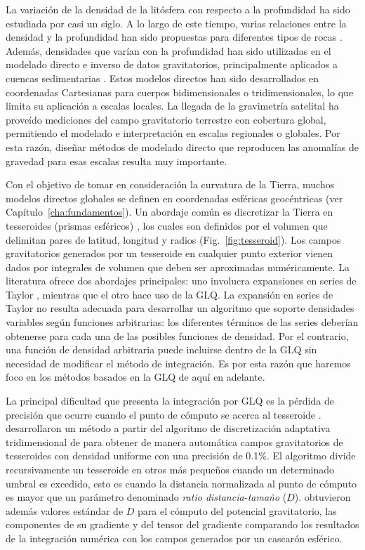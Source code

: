 La variación de la densidad de la litósfera con respecto a la profundidad ha
sido estudiada por casi un siglo.
A lo largo de este tiempo, varias relaciones entre la densidad y la profundidad
han sido propuestas para diferentes tipos de rocas
\citep[por ejemplo~][]{maxant1980, rao1986, rao1993, rao1994}.
Además, densidades que varían con la profundidad han sido utilizadas en el
modelado directo e inverso de datos gravitatorios, principalmente aplicados
a cuencas sedimentarias
\citep{cordell1973, rao1986, cowie1990, rao1993, rao1994, zhang2001,
welford2010}.
Estos modelos directos han sido desarrollados en coordenadas Cartesianas para
cuerpos bidimensionales o tridimensionales, lo que limita su aplicación
a escalas locales.
La llegada de la gravimetría satelital ha proveído mediciones del campo
gravitatorio terrestre con cobertura global, permitiendo el modelado
e interpretación en escalas regionales o globales.
Por esta razón, diseñar métodos de modelado directo que reproducen las
anomalías de gravedad para esas escalas resulta muy importante.

Con el objetivo de tomar en consideración la curvatura de la Tierra, muchos
modelos directos globales se definen en coordenadas esféricas geocéntricas
(ver Capítulo~\ref{cha:fundamentos}).
Un abordaje común es discretizar la Tierra en tesseroides (prismas esféricos)
\citep{anderson1976}, los cuales son definidos por el volumen que delimitan
pares de latitud, longitud y radios (Fig.~\ref{fig:tesseroid}).
Los campos gravitatorios generados por un tesseroide en cualquier punto
exterior vienen dados por integrales de volumen que deben ser aproximadas
numéricamente.
La literatura ofrece dos abordajes principales: uno involucra expansiones en
series de Taylor \citep{heck2006, grombein2013}, mientras que el otro hace uso
de la \ac{GLQ}.
La expansión en series de Taylor no resulta adecuada para desarrollar un
algoritmo que soporte densidades variables según funciones arbitrarias: los
diferentes términos de las series deberían obtenerse para cada una de las
posibles funciones de densidad.
Por el contrario, una función de densidad arbitraria puede incluirse dentro de
la \ac{GLQ} sin necesidad de modificar el método de integración.
Es por esta razón que haremos foco en los métodos basados en la \ac{GLQ} de
aquí en adelante.

La principal dificultad que presenta la integración por \ac{GLQ} es la pérdida
de precisión que ocurre cuando el punto de cómputo se acerca al tesseroide
\citep{ku1977}.
\citet{uieda2016} desarrollaron un método a partir del algoritmo de
discretización adaptativa tridimensional de \citet{li2011} para obtener de
manera automática campos gravitatorios de tesseroides con densidad uniforme
con una precisión de 0.1\%.
El algoritmo divide recursivamente un tesseroide en otros más pequeños cuando
un determinado umbral es excedido, esto es cuando la distancia normalizada
al punto de cómputo es mayor que un parámetro denominado \emph{ratio
distancia-tamaño} ($D$).
\citet{uieda2016} obtuvieron además valores estándar de $D$ para el cómputo del
potencial gravitatorio, las componentes de su gradiente y del tensor del
gradiente comparando los resultados de la integración numérica con los campos
generados por un cascarón esférico.

